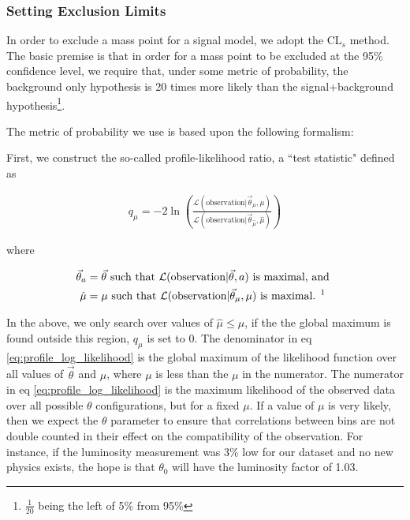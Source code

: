     \subsubsection{Setting Exclusion Limits} \label{sec:setting_exclusion_limits}

      In order to exclude a mass point for a signal model, we adopt the CL$_s$ method. The basic premise is that in order for a mass point to be excluded at the 95\% confidence level, we require that, under some metric of probability, the background only hypothesis is 20 times more likely than the signal+background hypothesis\footnote{$\frac{1}{20}$ being the left of 5\% from 95\%}.

      The metric of probability we use is based upon the following formalism: 

      First, we construct the so-called profile-likelihood ratio, a ``test statistic" defined as

      \begin{align} \label{eq:profile_log_likelihood}
        q_\mu = -2 \ln \left( \frac{\mathcal{L}(\text{observation} | \vec{\theta}_{\mu}, \mu)}{\mathcal{L}(\text{observation} | \vec{\theta}_{\hat{\mu}}, \hat{\mu})} \right)
      \end{align}

      where

      \begin{align*}
        \vec{\theta}_a &= \vec{\theta} \text{ such that } \mathcal{L}(\text{observation} | \vec{\theta}, a) \text{ is maximal, and } \\
        \hat{\mu} &= \mu \text{ such that } \mathcal{L}(\text{observation} | \vec{\theta}_\mu, \mu) \text{ is maximal. \footnotemark{} }
      \end{align*}
      
       In the above, we only search over values of $\hat{\mu} \le \mu$, if the the global maximum is found outside this region, $q_\mu$ is set to 0. The denominator in eq \ref{eq:profile_log_likelihood} is the global maximum of the likelihood function over all values of $\vec{\theta}$ and $\mu$, where $\mu$ is less than the $\mu$ in the numerator. The numerator in eq \ref{eq:profile_log_likelihood} is the maximum likelihood of the observed data over all possible $\theta$ configurations, but for a fixed $\mu$. If a value of $\mu$ is very likely, then we expect the $\theta$ parameter to ensure that correlations between bins are not double counted in their effect on the compatibility of the observation. For instance, if the luminosity measurement was 3\% low for our dataset and no new physics exists, the hope is that $\theta_0$ will have the luminosity factor of 1.03.

